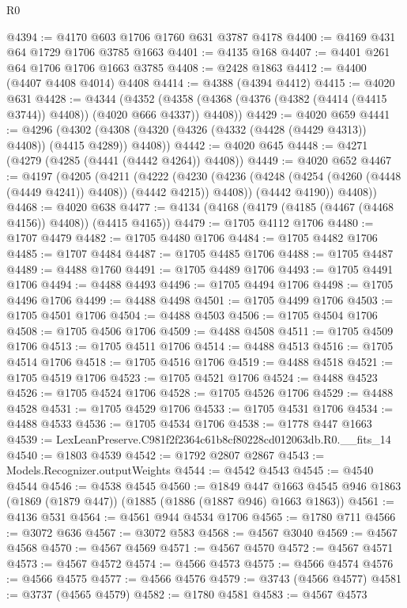 \begin{lexlean}{R0}
\begin{coremodule}
@4394 := @4170 @603 @1706 @1760 @631 @3787 @4178
@4400 := @4169 @431 @64 @1729 @1706 @3785 @1663
@4401 := @4135 @168
@4407 := @4401 @261 @64 @1706 @1706 @1663 @3785
@4408 := @2428 @1863
@4412 := @4400 (@4407 @4408 @4014) @4408
@4414 := @4388 (@4394 @4412)
@4415 := @4020 @631
@4428 := @4344
    (@4352 (@4358 (@4368 (@4376 (@4382 (@4414 (@4415 @3744)) @4408)) (@4020 @666 @4337)) @4408))
@4429 := @4020 @659
@4441 := @4296
    (@4302 (@4308 (@4320 (@4326 (@4332 (@4428 (@4429 @4313)) @4408)) (@4415 @4289)) @4408))
@4442 := @4020 @645
@4448 := @4271 (@4279 (@4285 (@4441 (@4442 @4264)) @4408))
@4449 := @4020 @652
@4467 := @4197
    (@4205
      (@4211
        (@4222
          (@4230 (@4236 (@4248 (@4254 (@4260 (@4448 (@4449 @4241)) @4408)) (@4442 @4215)) @4408))
          (@4442 @4190))
        @4408))
@4468 := @4020 @638
@4477 := @4134 (@4168 (@4179 (@4185 (@4467 (@4468 @4156)) @4408)) (@4415 @4165))
@4479 := @1705 @4112 @1706
@4480 := @1707 @4479
@4482 := @1705 @4480 @1706
@4484 := @1705 @4482 @1706
@4485 := @1707 @4484
@4487 := @1705 @4485 @1706
@4488 := @1705 @4487
@4489 := @4488 @1760
@4491 := @1705 @4489 @1706
@4493 := @1705 @4491 @1706
@4494 := @4488 @4493
@4496 := @1705 @4494 @1706
@4498 := @1705 @4496 @1706
@4499 := @4488 @4498
@4501 := @1705 @4499 @1706
@4503 := @1705 @4501 @1706
@4504 := @4488 @4503
@4506 := @1705 @4504 @1706
@4508 := @1705 @4506 @1706
@4509 := @4488 @4508
@4511 := @1705 @4509 @1706
@4513 := @1705 @4511 @1706
@4514 := @4488 @4513
@4516 := @1705 @4514 @1706
@4518 := @1705 @4516 @1706
@4519 := @4488 @4518
@4521 := @1705 @4519 @1706
@4523 := @1705 @4521 @1706
@4524 := @4488 @4523
@4526 := @1705 @4524 @1706
@4528 := @1705 @4526 @1706
@4529 := @4488 @4528
@4531 := @1705 @4529 @1706
@4533 := @1705 @4531 @1706
@4534 := @4488 @4533
@4536 := @1705 @4534 @1706
@4538 := @1778 @447 @1663
@4539 := LexLeanPreserve.C981f2f2364c61b8cf80228cd012063db.R0.__fits_14
@4540 := @1803 @4539
@4542 := @1792 @2807 @2867
@4543 := Models.Recognizer.outputWeights
@4544 := @4542 @4543
@4545 := @4540 @4544
@4546 := @4538 @4545
@4560 := @1849
    @447
    @1663
    @4545
    @946
    @1863
    (@1869 (@1879 @447))
    (@1885 (@1886 (@1887 @946) @1663 @1863))
@4561 := @4136 @531
@4564 := @4561 @944 @4534 @1706
@4565 := @1780 @711
@4566 := @3072 @636
@4567 := @3072 @583
@4568 := @4567 @3040
@4569 := @4567 @4568
@4570 := @4567 @4569
@4571 := @4567 @4570
@4572 := @4567 @4571
@4573 := @4567 @4572
@4574 := @4566 @4573
@4575 := @4566 @4574
@4576 := @4566 @4575
@4577 := @4566 @4576
@4579 := @3743 (@4566 @4577)
@4581 := @3737 (@4565 @4579)
@4582 := @1780 @4581
@4583 := @4567 @4573

\end{coremodule}
\end{lexlean}
